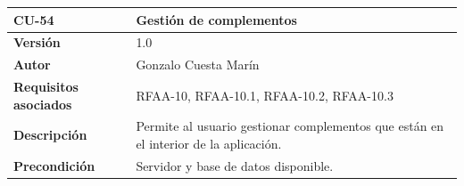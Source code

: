 \documentclass[
]{article}
\begin{document}
\begin{longtable}[]{@{}ll@{}}
\toprule
\begin{minipage}[b]{0.21\columnwidth}\raggedright
\textbf{CU-54}\strut
\end{minipage} & \begin{minipage}[b]{0.73\columnwidth}\raggedright
\textbf{Gestión de complementos}\strut
\end{minipage}\tabularnewline
\midrule
\endhead
\begin{minipage}[t]{0.21\columnwidth}\raggedright
\textbf{Versión}\strut
\end{minipage} & \begin{minipage}[t]{0.73\columnwidth}\raggedright
1.0\strut
\end{minipage}\tabularnewline
\begin{minipage}[t]{0.21\columnwidth}\raggedright
\textbf{Autor}\strut
\end{minipage} & \begin{minipage}[t]{0.73\columnwidth}\raggedright
Gonzalo Cuesta Marín\strut
\end{minipage}\tabularnewline
\begin{minipage}[t]{0.21\columnwidth}\raggedright
\textbf{Requisitos asociados}\strut
\end{minipage} & \begin{minipage}[t]{0.73\columnwidth}\raggedright
RFAA-10, RFAA-10.1, RFAA-10.2, RFAA-10.3\strut
\end{minipage}\tabularnewline
\begin{minipage}[t]{0.21\columnwidth}\raggedright
\textbf{Descripción}\strut
\end{minipage} & \begin{minipage}[t]{0.73\columnwidth}\raggedright
Permite al usuario gestionar complementos que están en el interior de la
aplicación.\strut
\end{minipage}\tabularnewline
\begin{minipage}[t]{0.21\columnwidth}\raggedright
\textbf{Precondición}\strut
\end{minipage} & \begin{minipage}[t]{0.73\columnwidth}\raggedright
Servidor y base de datos disponible.


\end{minipage}
\end{longtable}
\end{document}
